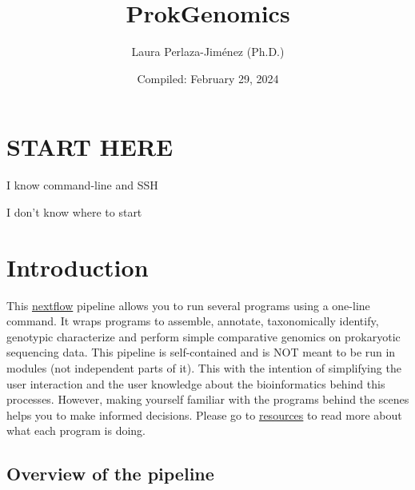 \documentclass[
]{book}
\title{ProkGenomics}
\author{Laura Perlaza-Jiménez (Ph.D.)}
\date{Compiled: February 29, 2024}
\begin{document}
\maketitle

{
\setcounter{tocdepth}{1}
\tableofcontents
}
\hypertarget{start-here}{%
\chapter{START HERE}\label{start-here}}

{I know command-line and SSH}

{I don't know where to start}

\hypertarget{introduction}{%
\chapter{Introduction}\label{introduction}}

This \href{https://www.nextflow.io/}{nextflow} pipeline allows you to run several programs using a one-line command. It wraps programs to assemble, annotate, taxonomically identify, genotypic characterize and perform simple comparative genomics on prokaryotic sequencing data. This pipeline is self-contained and is NOT meant to be run in modules (not independent parts of it). This with the intention of simplifying the user interaction and the user knowledge about the bioinformatics behind this processes. However, making yourself familiar with the programs behind the scenes helps you to make informed decisions. Please go to \href{resources.html}{resources} to read more about what each program is doing.

\hypertarget{overview-of-the-pipeline}{%
\section{Overview of the pipeline}\label{overview-of-the-pipeline}}
\end{document}
